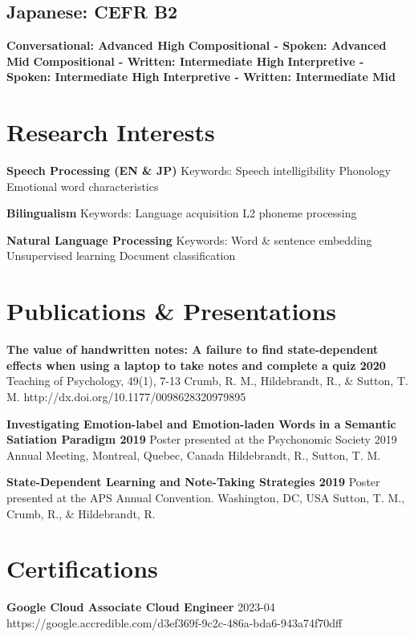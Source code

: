 \documentclass[letterpaper]{deedy-resume_sm}
\begin{document}
\subsection{Japanese: CEFR B2}
\textbf{Conversational: Advanced High}
\textbf{Compositional - Spoken: Advanced Mid}
\textbf{Compositional - Written: Intermediate High}
\textbf{Interpretive - Spoken: Intermediate High}
\textbf{Interpretive - Written: Intermediate Mid}

\section{Research Interests}
\textbf{Speech Processing (EN \& JP)}
Keywords: Speech intelligibility \textbullet{} Phonology \textbullet{} Emotional word characteristics

\textbf{Bilingualism}
Keywords: Language acquisition \textbullet{} L2 phoneme processing

\textbf{Natural Language Processing}
Keywords: Word \& sentence embedding \textbullet{} Unsupervised learning \textbullet{} Document classification

\section{Publications \& Presentations}
\textbf{The value of handwritten notes: A failure to find state-dependent effects when using a laptop to take notes and complete a quiz 2020}
Teaching of Psychology, 49(1), 7-13
Crumb, R. M., Hildebrandt, R., \& Sutton, T. M.
http://dx.doi.org/10.1177/0098628320979895

\textbf{Investigating Emotion-label and Emotion-laden Words in a Semantic Satiation Paradigm 2019}
Poster presented at the Psychonomic Society 2019 Annual Meeting, Montreal, Quebec, Canada
Hildebrandt, R., Sutton, T. M.

\textbf{State-Dependent Learning and Note-Taking Strategies 2019}
Poster presented at the APS Annual Convention. Washington, DC, USA
Sutton, T. M., Crumb, R., \& Hildebrandt, R.

\section{Certifications}
\textbf{Google Cloud Associate Cloud Engineer}
2023-04
https://google.accredible.com/d3ef369f-9c2c-486a-bda6-943a74f70dff
\end{document}
